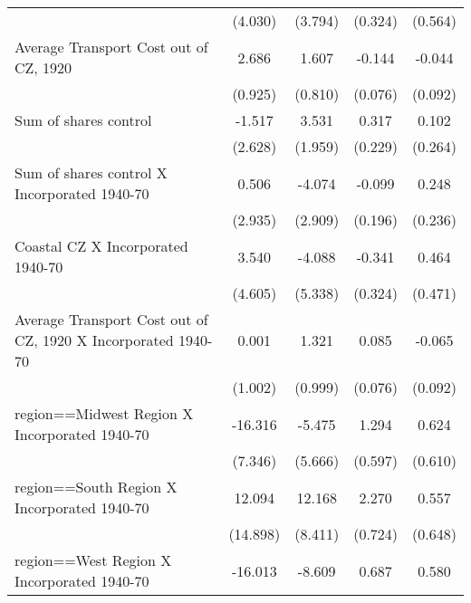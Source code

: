 \begin{table}[htbp]
\begin{tabular}{l*{4}{c}}
                    &     (4.030)         &     (3.794)         &     (0.324)         &     (0.564)         \\
[1em]
Average Transport Cost out of CZ, 1920&       2.686\sym{***}&       1.607\sym{**} &      -0.144\sym{*}  &      -0.044         \\
                    &     (0.925)         &     (0.810)         &     (0.076)         &     (0.092)         \\
[1em]
Sum of shares control&      -1.517         &       3.531\sym{*}  &       0.317         &       0.102         \\
                    &     (2.628)         &     (1.959)         &     (0.229)         &     (0.264)         \\
[1em]
Sum of shares control X Incorporated 1940-70&       0.506         &      -4.074         &      -0.099         &       0.248         \\
                    &     (2.935)         &     (2.909)         &     (0.196)         &     (0.236)         \\
[1em]
Coastal CZ X Incorporated 1940-70&       3.540         &      -4.088         &      -0.341         &       0.464         \\
                    &     (4.605)         &     (5.338)         &     (0.324)         &     (0.471)         \\
[1em]
Average Transport Cost out of CZ, 1920 X Incorporated 1940-70&       0.001         &       1.321         &       0.085         &      -0.065         \\
                    &     (1.002)         &     (0.999)         &     (0.076)         &     (0.092)         \\
[1em]
region==Midwest Region X Incorporated 1940-70&     -16.316\sym{**} &      -5.475         &       1.294\sym{**} &       0.624         \\
                    &     (7.346)         &     (5.666)         &     (0.597)         &     (0.610)         \\
[1em]
region==South Region X Incorporated 1940-70&      12.094         &      12.168         &       2.270\sym{***}&       0.557         \\
                    &    (14.898)         &     (8.411)         &     (0.724)         &     (0.648)         \\
[1em]
region==West Region X Incorporated 1940-70&     -16.013\sym{**} &      -8.609         &       0.687         &       0.580         \\

\end{tabular}
\end{table}
